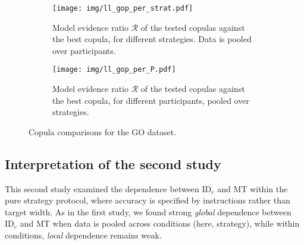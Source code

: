 \documentclass[acmlarge, manuscript,review]{acmart}
\newcommand{\ide}{\ensuremath{{\text{ID}_e}}\xspace}
\begin{document}
\begin{figure}[htbp]
   \centering
   \begin{subfigure}[t]{0.48\textwidth}
	   \texttt{[image: img/ll\_gop\_per\_strat.pdf]}
	\caption{Model evidence ratio $\mathcal{R}$ of the tested copulas against the best copula, for different strategies. Data is pooled over participants.}
	\label{fig:r_cop_gop_s}
   \end{subfigure}
   \hfill
   \begin{subfigure}[t]{0.48\textwidth}
	   \texttt{[image: img/ll\_gop\_per\_P.pdf]}
	\caption{Model evidence ratio $\mathcal{R}$ of the tested copulas against the best copula, for different participants, pooled over strategies.}
	\label{fig:ll_cop_gop_p}
   \end{subfigure}
 
\caption{Copula comparisons for the GO dataset.}
\end{figure}







\subsection{Interpretation of the second study}
This second study examined the dependence between \ide and MT within the pure strategy protocol, where accuracy is specified by instructions rather than target width. 
As in the first study, we found strong \textit{global} dependence between \ide and MT when data is pooled across conditions (here, strategy), while within conditions, \textit{local} dependence remains weak.
\end{document}

